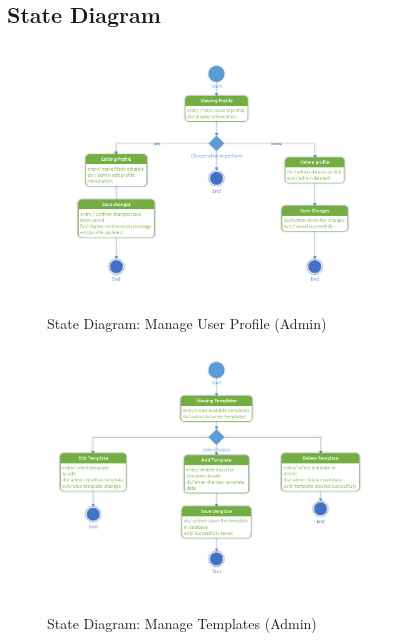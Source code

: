 \documentclass[12pt]{report}
\begin{document}
\clearpage   %
\subsection{State Diagram}

\begin{figure}[ht]
    \centering
    \includegraphics[width=0.8\textwidth]{Media/Binder2.pdf_Page_12.jpg} %
    \caption{State Diagram: Manage User Profile (Admin)}
    \label{fig:drawing1}
\end{figure}

\begin{figure}[ht]
    \centering
    \includegraphics[width=0.8\textwidth]{Media/Binder2.pdf_Page_13.jpg} %
    \caption{State Diagram: Manage Templates (Admin)}
    \label{fig:drawing1}
\end{figure}
\end{document}
